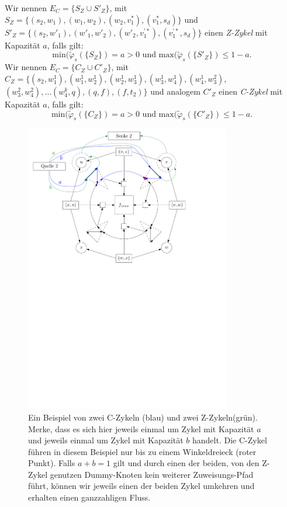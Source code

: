 \begin{definition}
Wir nennen $E_C=\{S_Z \cup S'_Z\}$, mit  $S_Z = \{(s_2,w_1),(w_1,w_2),(w_2,v_1^*),(v_1^*,s_d)\}$ und $S'_Z=\{(s_2,w'_1),(w'_1,w'_2),(w'_2,v^{'*}_1),(v^{'*}_1,s_d)\}$ einen \textit{Z-Zykel} mit Kapazität $a$, falls gilt: 
$$\text{min}(\tilde{\varphi}_s(\{S_Z\}) = a > 0 \text{ und } \text{max}(\tilde{\varphi}_s(\{S'_Z\}) \leq 1 - a.$$
Wir nennen $E_C=\{C_Z \cup C'_Z\}$, mit  $C_Z = \{(s_2,w^1_1), (w^1_1,w^1_2), (w^1_2,w^1_3), (w^1_3,w^1_4), (w^1_4,w^2_3), $ $(w^2_3,w^2_4), \ldots (w^k_4,q),(q,f),(f,t_2)\}$ und analogem $C'_Z$ einen \textit{C-Zykel} mit Kapazität $a$, falls gilt: 
$$\text{min}(\tilde{\varphi}_s(\{C_Z\}) = a > 0 \text{ und } \text{max}(\tilde{\varphi}_s(\{C'_Z\}) \leq 1 - a.$$
\end{definition}

\begin{figure}[b!]
\centering
\includegraphics[width=0.8\textwidth]{combined_face_alt_cycle.pdf}
\caption{Ein Beispiel von zwei C-Zykeln (blau) und zwei Z-Zykeln(grün). Merke, dass es sich hier jeweils einmal um Zykel mit Kapazität $a$ und jeweils einmal um Zykel mit Kapazität $b$ handelt. Die C-Zykel führen in diesem Beispiel nur bis zu einem Winkeldreieck (roter Punkt). Falls $a+b=1$ gilt und durch einen der beiden, von den Z-Zykel genutzen Dummy-Knoten kein weiterer Zuweisungs-Pfad führt, können wir jeweils einen der beiden Zykel umkehren und erhalten einen ganzzahligen Fluss.}
\label{combined_face_alt_cycle}
\end{figure}

